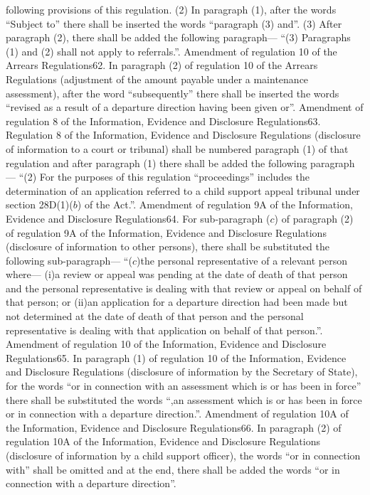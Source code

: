\documentclass[a4paper]{article}
\begin{document}
following provisions of this regulation.
(2) In paragraph (1), after the words “Subject to” there shall be inserted the
words “paragraph (3) and”.
(3) After paragraph (2), there shall be added the following paragraph—
“(3) Paragraphs (1) and (2) shall not apply to referrals.”.
Amendment of regulation 10 of the Arrears Regulations62. In paragraph (2) of
regulation 10 of the Arrears Regulations (adjustment of the amount payable under
a maintenance assessment), after the word “subsequently” there shall be inserted
the words “revised as a result of a departure direction having been given or”.
Amendment of regulation 8 of the Information, Evidence and Disclosure
Regulations63. Regulation 8 of the Information, Evidence and Disclosure
Regulations (disclosure of information to a court or tribunal) shall be numbered
paragraph (1) of that regulation and after paragraph (1) there shall be added
the following paragraph—
“(2) For the purposes of this regulation “proceedings” includes the
determination of an application referred to a child support appeal tribunal
under section 28D(1)($b$) of the Act.”.
Amendment of regulation 9A of the Information, Evidence and Disclosure
Regulations64. For sub-paragraph ($c$) of paragraph (2) of regulation 9A of the
Information, Evidence and Disclosure Regulations (disclosure of information to
other persons), there shall be substituted the following sub-paragraph—
“($c$)the personal representative of a relevant person where—
(i)a review or appeal was pending at the date of death of that person and the
personal representative is dealing with that review or appeal on behalf of that
person; or
(ii)an application for a departure direction had been made but not determined at
the date of death of that person and the personal representative is dealing with
that application on behalf of that person.”.
Amendment of regulation 10 of the Information, Evidence and Disclosure
Regulations65. In paragraph (1) of regulation 10 of the Information, Evidence
and Disclosure Regulations (disclosure of information by the Secretary of
State), for the words “or in connection with an assessment which is or has been
in force” there shall be substituted the words “,an assessment which is or has
been in force or in connection with a departure direction.”.
Amendment of regulation 10A of the Information, Evidence and Disclosure
Regulations66. In paragraph (2) of regulation 10A of the Information, Evidence
and Disclosure Regulations (disclosure of information by a child support
officer), the words “or in connection with” shall be omitted and at the end,
there shall be added the words “or in connection with a departure direction”.
\end{document}

